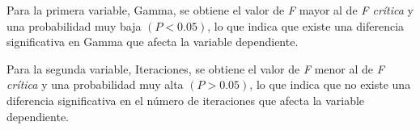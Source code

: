 Para la primera variable, Gamma, se obtiene el valor de \textit{F} mayor al de \textit{F crítica} y una probabilidad muy baja $(P<0.05)$, lo que indica que existe una diferencia significativa en Gamma que afecta la variable dependiente.

Para la segunda variable, Iteraciones, se obtiene el valor de \textit{F} menor al de \textit{F crítica} y una probabilidad muy alta $(P>0.05)$, lo que indica que no existe una diferencia significativa en el número de iteraciones que afecta la variable dependiente.

